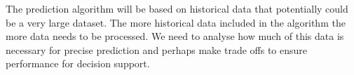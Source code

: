 The prediction algorithm will be based on historical data that potentially could be a very large dataset. The more historical data included in the algorithm the more data needs to be processed. We need to analyse how much of this data is necessary for precise prediction and perhaps make trade offs to ensure performance for decision support.